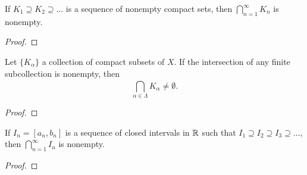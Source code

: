 \documentclass[a4paper]{report}
\begin{document}
\begin{corollary}
If \( {K}_{1} \supseteq {K}_{2} \supseteq \dots  \) is a sequence of nonempty compact sets, then \( \bigcap_{ n=1  }^{ \infty   }  {K }_{n} \) is nonempty.
\end{corollary}
\begin{proof}

\end{proof}



\begin{theorem}[ ]\label{Theorem 2.36}
    Let \( \{ {K}_{\alpha} \}   \) a collection of compact subsets of \( X  \). If the intersection of any finite subcollection is nonempty, then
    \[  \bigcap_{ \alpha \in \Lambda }^{  } {K}_{\alpha} \neq \emptyset. \]
\end{theorem}
\begin{proof}

\end{proof}


\begin{theorem}
    If \( {I}_{n} = [{a}_{n}, {b}_{n}] \) is a sequence of closed intervals in \( \mathbb{R}  \) such that \( {I}_{1} \supseteq {I}_{2} \supseteq {I}_{3} \supseteq \dots  \), then \( \bigcap_{ n=1  }^{ \infty   }  {I}_{n} \) is nonempty. 
\end{theorem}
\begin{proof}

\end{proof}
\end{document}
